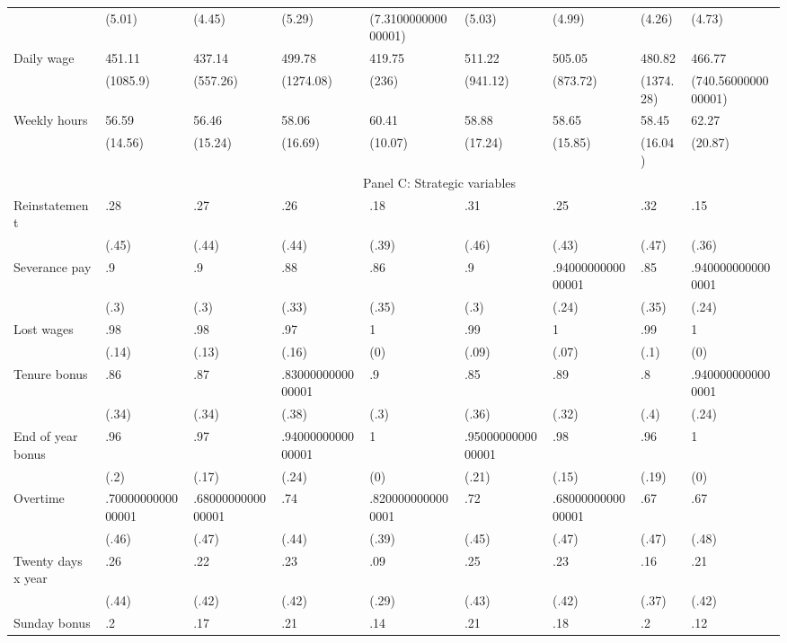 \begin{tabular}{lllllllll}
      & (5.01) & (4.45) & (5.29) & (7.310000000000001) & (5.03) & (4.99) & (4.26) & (4.73) \\
Daily wage & 451.11 & 437.14 & 499.78 & 419.75 & 511.22 & 505.05 & 480.82 & 466.77 \\
      & (1085.9) & (557.26) & (1274.08) & (236) & (941.12) & (873.72) & (1374.28) & (740.5600000000001) \\
Weekly hours & 56.59 & 56.46 & 58.06 & 60.41 & 58.88 & 58.65 & 58.45 & 62.27 \\
      & (14.56) & (15.24) & (16.69) & (10.07) & (17.24) & (15.85) & (16.04) & (20.87) \\
\midrule
      & \multicolumn{8}{c}{Panel C: Strategic  variables} \\
\midrule
\midrule
Reinstatement & .28   & .27   & .26   & .18   & .31   & .25   & .32   & .15 \\
      & (.45) & (.44) & (.44) & (.39) & (.46) & (.43) & (.47) & (.36) \\
Severance pay & .9    & .9    & .88   & .86   & .9    & .9400000000000001 & .85   & .9400000000000001 \\
      & (.3)  & (.3)  & (.33) & (.35) & (.3)  & (.24) & (.35) & (.24) \\
Lost wages & .98   & .98   & .97   & 1     & .99   & 1     & .99   & 1 \\
      & (.14) & (.13) & (.16) & (0)   & (.09) & (.07) & (.1)  & (0) \\
Tenure bonus & .86   & .87   & .8300000000000001 & .9    & .85   & .89   & .8    & .9400000000000001 \\
      & (.34) & (.34) & (.38) & (.3)  & (.36) & (.32) & (.4)  & (.24) \\
End of year bonus & .96   & .97   & .9400000000000001 & 1     & .9500000000000001 & .98   & .96   & 1 \\
      & (.2)  & (.17) & (.24) & (0)   & (.21) & (.15) & (.19) & (0) \\
Overtime & .7000000000000001 & .6800000000000001 & .74   & .8200000000000001 & .72   & .6800000000000001 & .67   & .67 \\
      & (.46) & (.47) & (.44) & (.39) & (.45) & (.47) & (.47) & (.48) \\
Twenty days x year & .26   & .22   & .23   & .09   & .25   & .23   & .16   & .21 \\
      & (.44) & (.42) & (.42) & (.29) & (.43) & (.42) & (.37) & (.42) \\
Sunday bonus & .2    & .17   & .21   & .14   & .21   & .18   & .2    & .12 \\

\end{tabular}
